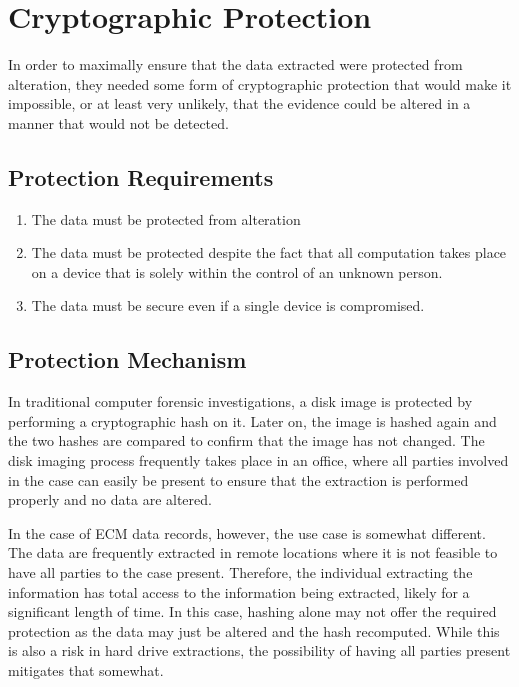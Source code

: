 \chapter{Cryptographic Protection}

In order to maximally ensure that the data extracted were protected from alteration,
they needed some form of cryptographic protection that would make it impossible, or at
least very unlikely, that the evidence could be altered in a manner that would not be
detected.

\section{Protection Requirements}

\begin{enumerate}
  \item The data must be protected from alteration
  \item The data must be protected despite the fact that all computation takes
        place on a device that is solely within the control of an unknown person.
  \item The data must be secure even if a single device is compromised.

\end{enumerate}

\section{Protection Mechanism}

In traditional computer forensic investigations, a disk image is protected by performing
a cryptographic hash on it. Later on, the image is hashed again and the two hashes are compared
to confirm that the image has not changed. The disk imaging process frequently takes place in an
office, where all parties involved in the case can easily be present to ensure that the extraction
is performed properly and no data are altered.

In the case of ECM data records, however, the use case is somewhat different. The data are frequently
extracted in remote locations where it is not feasible to have all parties to the case present. Therefore,
the individual extracting the information has total access to the information being extracted, likely for
a significant length of time. In this case, hashing alone may not offer the required protection as the data
may just be altered and the hash recomputed. While this is also a risk in hard drive extractions, the possibility
of having all parties present mitigates that somewhat.

